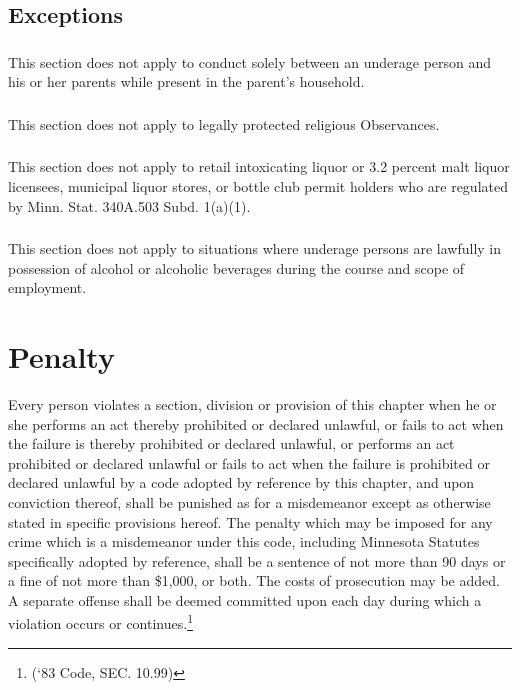 \subsection{Exceptions}
\subsubsection{}
This section does not apply to conduct solely between an underage person and his or her parents while present in the parent’s household.
\subsubsection{}
This section does not apply to legally protected religious Observances.
\subsubsection{}
This section does not apply to retail intoxicating liquor or 3.2 percent malt liquor licensees, municipal liquor stores, or bottle club permit holders who are regulated by Minn. Stat. \textsection 340A.503 Subd. 1(a)(1).
\subsubsection{}
This section does not apply to situations where underage persons are lawfully in possession of alcohol or alcoholic beverages during the course and scope of employment.

\setcounter{section}{98}
\section{Penalty}
Every person violates a section, division or provision of this chapter when he or she performs an act thereby prohibited or declared unlawful, or fails to act when the failure is thereby prohibited or declared unlawful, or performs an act prohibited or declared unlawful or fails to act when the failure is prohibited or declared unlawful by a code adopted by reference by this chapter, and upon conviction thereof, shall be punished as for a misdemeanor except as otherwise stated in specific provisions hereof. The penalty which may be imposed for any crime which is a misdemeanor under this code, including Minnesota Statutes specifically adopted by reference, shall be a sentence of not more than 90 days or a fine of not more than \$1,000, or both. The costs of prosecution may be added. A separate offense shall be deemed committed upon each day during which a violation occurs or continues.\footnote{(‘83 Code, SEC. 10.99)}
